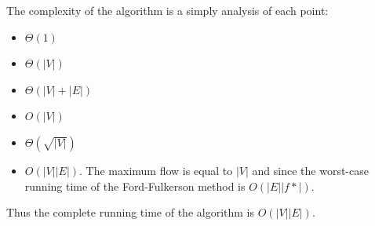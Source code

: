 \documentclass[koma,a4paper]{article}
\begin{document}
The complexity of the algorithm is a simply analysis of each point:

\begin{itemize}
  \item $\Theta(1)$
  \item $\Theta\left(|V|\right)$
  \item $\Theta\left(|V| + |E|\right)$
  \item $O(|V|)$
  \item $\Theta\left(\sqrt{|V|}\right)$
  \item $O\left(|V||E|\right)$. The maximum flow is equal to $|V|$ and since the worst-case running time of the Ford-Fulkerson method is $O\left(|E||f*|\right)$.
\end{itemize}

Thus the complete running time of the algorithm is $O\left(|V||E|\right)$.
\end{document}
